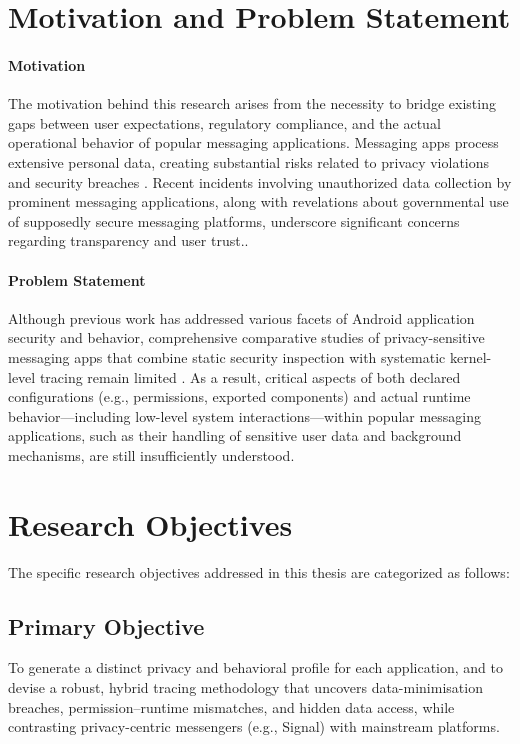 \documentclass[a4paper,12pt]{report}
\begin{document}
\section{Motivation and Problem Statement}

\paragraph{Motivation}
The motivation behind this research arises from the necessity to bridge existing
gaps between user expectations, regulatory compliance, and the actual operational
behavior of popular messaging applications. Messaging apps process extensive personal
data, creating substantial risks related to privacy violations and security breaches \cite{ArsTechnica2018}.
Recent incidents involving unauthorized data collection by prominent messaging
applications, along with revelations about governmental use of supposedly secure
messaging platforms, underscore significant concerns regarding transparency
and user trust.\cite{ArsTechnica2018, Reuters2021WhatsAppExodus, Politico2025Signal}.

\paragraph{Problem Statement}


Although previous work has addressed various facets of Android application security and behavior, comprehensive comparative studies of privacy-sensitive messaging apps that combine static security inspection with systematic kernel-level tracing remain limited \cite{DynamicSecurityAnalysis2023}. As a result, critical aspects of both declared configurations (e.g., permissions, exported components) and actual runtime behavior—including low-level system interactions—within popular messaging applications, such as their handling of sensitive user data and background mechanisms, are still insufficiently understood.
\section{Research Objectives}

The specific research objectives addressed in this thesis are categorized as follows:

\subsection*{Primary Objective}

To generate a distinct privacy and behavioral profile for each application, and to devise a robust, hybrid tracing methodology that uncovers data-minimisation breaches, permission–runtime mismatches, and hidden data access, while contrasting privacy-centric messengers (e.g., Signal) with mainstream platforms.
\end{document}

